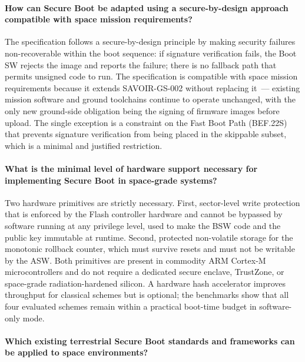 \paragraph{How can Secure Boot be adapted using a secure-by-design approach compatible with space mission requirements?}

The specification follows a secure-by-design principle by making security failures non-recoverable within the boot sequence: if signature verification fails, the Boot SW rejects the image and reports the failure; there is no fallback path that permits unsigned code to run. The specification is compatible with space mission requirements because it extends SAVOIR-GS-002 without replacing it~--- existing mission software and ground toolchains continue to operate unchanged, with the only new ground-side obligation being the signing of firmware images before upload. The single exception is a constraint on the Fast Boot Path (BEF.22S) that prevents signature verification from being placed in the skippable subset, which is a minimal and justified restriction.

\paragraph{What is the minimal level of hardware support necessary for implementing Secure Boot in space-grade systems?}

Two hardware primitives are strictly necessary. First, sector-level write protection that is enforced by the Flash controller hardware and cannot be bypassed by software running at any privilege level, used to make the BSW code and the public key immutable at runtime. Second, protected non-volatile storage for the monotonic rollback counter, which must survive resets and must not be writable by the ASW. Both primitives are present in commodity ARM Cortex-M microcontrollers and do not require a dedicated secure enclave, TrustZone, or space-grade radiation-hardened silicon. A hardware hash accelerator improves throughput for classical schemes but is optional; the benchmarks show that all four evaluated schemes remain within a practical boot-time budget in software-only mode.

\paragraph{Which existing terrestrial Secure Boot standards and frameworks can be applied to space environments?}

